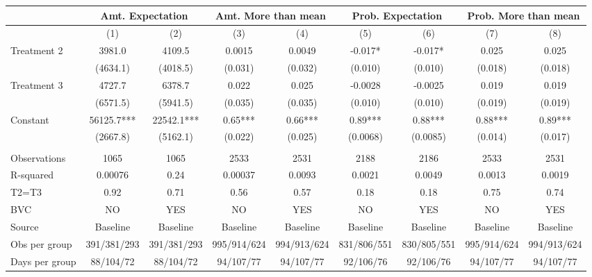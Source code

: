 \begin{tabular}{lcccccccc}
\toprule
      & \multicolumn{2}{c}{Amt. Expectation} & \multicolumn{2}{c}{Amt. More than mean} & \multicolumn{2}{c}{Prob. Expectation} & \multicolumn{2}{c}{Prob. More than mean} \\
\midrule
      & (1)   & (2)   & (3)   & (4)   & (5)   & (6)   & (7)   & (8) \\
\midrule
Treatment 2 & 3981.0 & 4109.5 & 0.0015 & 0.0049 & -0.017* & -0.017* & 0.025 & 0.025 \\
      & (4634.1) & (4018.5) & (0.031) & (0.032) & (0.010) & (0.010) & (0.018) & (0.018) \\
Treatment 3 & 4727.7 & 6378.7 & 0.022 & 0.025 & -0.0028 & -0.0025 & 0.019 & 0.019 \\
      & (6571.5) & (5941.5) & (0.035) & (0.035) & (0.010) & (0.010) & (0.019) & (0.019) \\
Constant & 56125.7*** & 22542.1*** & 0.65*** & 0.66*** & 0.89*** & 0.88*** & 0.88*** & 0.89*** \\
      & (2667.8) & (5162.1) & (0.022) & (0.025) & (0.0068) & (0.0085) & (0.014) & (0.017) \\
      &       &       &       &       &       &       &       &  \\
\midrule
Observations & 1065  & 1065  & 2533  & 2531  & 2188  & 2186  & 2533  & 2531 \\
R-squared & 0.00076 & 0.24  & 0.00037 & 0.0093 & 0.0021 & 0.0049 & 0.0013 & 0.0019 \\
T2=T3 & 0.92  & 0.71  & 0.56  & 0.57  & 0.18  & 0.18  & 0.75  & 0.74 \\
BVC   & NO    & YES   & NO    & YES   & NO    & YES   & NO    & YES \\
Source & Baseline & Baseline & Baseline & Baseline & Baseline & Baseline & Baseline & Baseline \\
Obs per group & 391/381/293 & 391/381/293 & 995/914/624 & 994/913/624 & 831/806/551 & 830/805/551 & 995/914/624 & 994/913/624 \\
Days per group & 88/104/72 & 88/104/72 & 94/107/77 & 94/107/77 & 92/106/76 & 92/106/76 & 94/107/77 & 94/107/77 \\
\bottomrule
\bottomrule
\end{tabular}%
